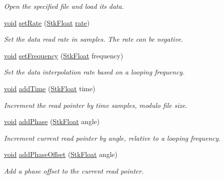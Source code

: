 \begin{DoxyCompactItemize}
\begin{DoxyCompactList}\small\item\em Open the specified file and load its data. \end{DoxyCompactList}\item 
\hyperlink{sound_8c_ae35f5844602719cf66324f4de2a658b3}{void} \hyperlink{class_nyq_1_1_wave_loop_ac601ee3f491652dd0823dde925edd93f}{set\+Rate} (\hyperlink{namespace_nyq_a044fa20a706520a617bbbf458a7db7e4}{Stk\+Float} \hyperlink{seqread_8c_ad89d3fac2deab7a9cf6cfc8d15341b85}{rate})
\begin{DoxyCompactList}\small\item\em Set the data read rate in samples. The rate can be negative. \end{DoxyCompactList}\item 
\hyperlink{sound_8c_ae35f5844602719cf66324f4de2a658b3}{void} \hyperlink{class_nyq_1_1_wave_loop_aa44e8486b53b6692bf8f89744775861d}{set\+Frequency} (\hyperlink{namespace_nyq_a044fa20a706520a617bbbf458a7db7e4}{Stk\+Float} frequency)
\begin{DoxyCompactList}\small\item\em Set the data interpolation rate based on a looping frequency. \end{DoxyCompactList}\item 
\hyperlink{sound_8c_ae35f5844602719cf66324f4de2a658b3}{void} \hyperlink{class_nyq_1_1_wave_loop_a1c6e894aa5083d57c956a5e33a22bb6c}{add\+Time} (\hyperlink{namespace_nyq_a044fa20a706520a617bbbf458a7db7e4}{Stk\+Float} time)
\begin{DoxyCompactList}\small\item\em Increment the read pointer by {\itshape time} samples, modulo file size. \end{DoxyCompactList}\item 
\hyperlink{sound_8c_ae35f5844602719cf66324f4de2a658b3}{void} \hyperlink{class_nyq_1_1_wave_loop_a7479e8af2c492ac61b7d63a3e3cabaf7}{add\+Phase} (\hyperlink{namespace_nyq_a044fa20a706520a617bbbf458a7db7e4}{Stk\+Float} angle)
\begin{DoxyCompactList}\small\item\em Increment current read pointer by {\itshape angle}, relative to a looping frequency. \end{DoxyCompactList}\item 
\hyperlink{sound_8c_ae35f5844602719cf66324f4de2a658b3}{void} \hyperlink{class_nyq_1_1_wave_loop_ae96449d916f7840bcad99e046a6a1355}{add\+Phase\+Offset} (\hyperlink{namespace_nyq_a044fa20a706520a617bbbf458a7db7e4}{Stk\+Float} angle)
\begin{DoxyCompactList}\small\item\em Add a phase offset to the current read pointer. \end{DoxyCompactList}\end{DoxyCompactItemize}
